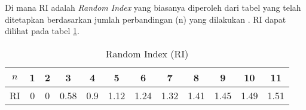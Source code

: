 \documentclass[journal,article,submit,pdftex,moreauthors]{Definitions/mdpi}
\begin{document}







Di mana RI adalah \textit{Random Index} yang biasanya diperoleh dari tabel yang telah ditetapkan berdasarkan jumlah perbandingan (n) yang dilakukan \cite{Singh2019}. RI dapat dilihat pada tabel \ref{random-index}.

\begin{table}[H]
    \caption{Random Index (RI)}
    \label{random-index}
    \centering
    \begin{tabular}{c|ccccccccccc}
        \toprule
        $n$ & 1 & 2 & 3 & 4 & 5 & 6 & 7 & 8 & 9 & 10 & 11 \\
        \midrule
        RI & 0 & 0 & 0.58 & 0.9 & 1.12 & 1.24 & 1.32 & 1.41 & 1.45 & 1.49 & 1.51 \\
        \bottomrule
    \end{tabular}
\end{table}







\end{document}
